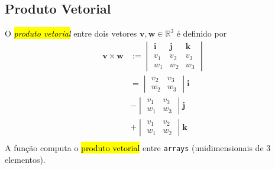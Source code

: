 \subsection{Produto Vetorial}

O \hl{\emph{produto vetorial}} entre dois vetores $\pmb{v}, \pmb{w}\in\mathbb{R}^3$ é definido por
\begin{subequations}
  \begin{align}
    \pmb{v}\times\pmb{w} &:=
                           \begin{vmatrix}
                             \pmb{i} & \pmb{j} & \pmb{k}\\
                             v_1 & v_2 & v_3\\
                             w_1 & w_2 & w_3
                           \end{vmatrix}\\
                         &=
                           \begin{vmatrix}
                             v_2 & v_3\\
                             w_2 & w_3
                           \end{vmatrix}\pmb{i}\\
                         &- \begin{vmatrix}
                             v_1 & v_3\\
                             w_1 & w_3
                           \end{vmatrix}\pmb{j}\\
                         &+ \begin{vmatrix}
                             v_1 & v_2\\
                             w_1 & w_2
                           \end{vmatrix}\pmb{k}\\
  \end{align}
\end{subequations}
A função {\PYTHONnumpyDOTcross} computa o \hl{produto vetorial} entre \texttt{arrays} (unidimensionais de 3 elementos).

